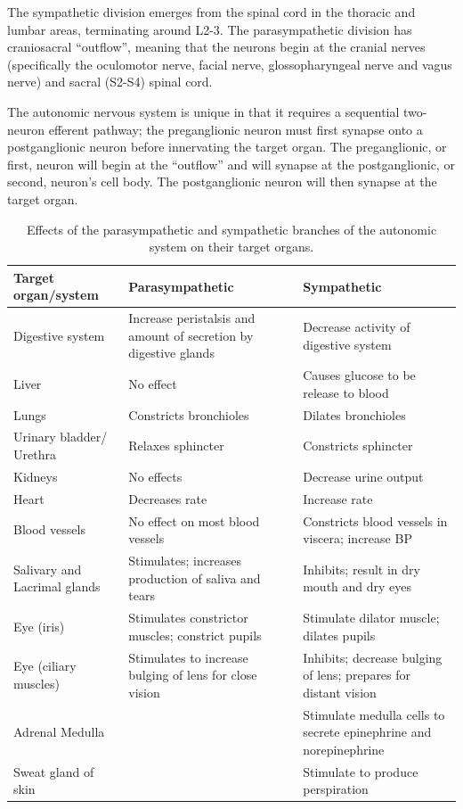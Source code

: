 The sympathetic division emerges from the spinal cord in the thoracic and lumbar areas, terminating around L2-3. The parasympathetic division has craniosacral ``outflow'', meaning that the neurons begin at the cranial nerves (specifically the oculomotor nerve, facial nerve, glossopharyngeal nerve and vagus nerve) and sacral (S2-S4) spinal cord.

The autonomic nervous system is unique in that it requires a sequential two-neuron efferent pathway; the preganglionic neuron must first synapse onto a postganglionic neuron before innervating the target organ. The preganglionic, or first, neuron will begin at the ``outflow'' and will synapse at the postganglionic, or second, neuron's cell body. The postganglionic neuron will then synapse at the target organ.

\begin{longtable}[t]{>{\raggedright\arraybackslash}p{5em}>{\raggedright\arraybackslash}p{10em}>{\raggedright\arraybackslash}p{35em}}
\caption{\label{tab:autonomic}Effects of the parasympathetic and sympathetic branches of the autonomic system on their target organs.}\\
\toprule
Target organ/system & Parasympathetic & Sympathetic\\
\midrule
\rowcolor{gray!6}  Digestive system & Increase peristalsis and amount of secretion by digestive glands & Decrease activity of digestive system\\
\cmidrule{1-3}
Liver & No effect & Causes glucose to be release to blood\\
\cmidrule{1-3}
\rowcolor{gray!6}  Lungs & Constricts bronchioles & Dilates bronchioles\\
\cmidrule{1-3}
Urinary bladder/ Urethra & Relaxes sphincter & Constricts sphincter\\
\cmidrule{1-3}
\rowcolor{gray!6}  Kidneys & No effects & Decrease urine output\\
\cmidrule{1-3}
Heart & Decreases rate & Increase rate\\
\cmidrule{1-3}
\rowcolor{gray!6}  Blood vessels & No effect on most blood vessels & Constricts blood vessels in viscera; increase BP\\
\cmidrule{1-3}
Salivary and Lacrimal glands & Stimulates; increases production of saliva and tears & Inhibits; result in dry mouth and dry eyes\\
\cmidrule{1-3}
\rowcolor{gray!6}  Eye (iris) & Stimulates constrictor muscles; constrict pupils & Stimulate dilator muscle; dilates pupils\\
\cmidrule{1-3}
Eye (ciliary muscles) & Stimulates to increase bulging of lens for close vision & Inhibits; decrease bulging of lens; prepares for distant vision\\
\cmidrule{1-3}
\rowcolor{gray!6}  Adrenal Medulla &  & Stimulate medulla cells to secrete epinephrine and norepinephrine\\

Sweat gland of skin & \multirow{-2}{10em}{\raggedright\arraybackslash No effect} & Stimulate to produce perspiration\\
\bottomrule
\end{longtable}

